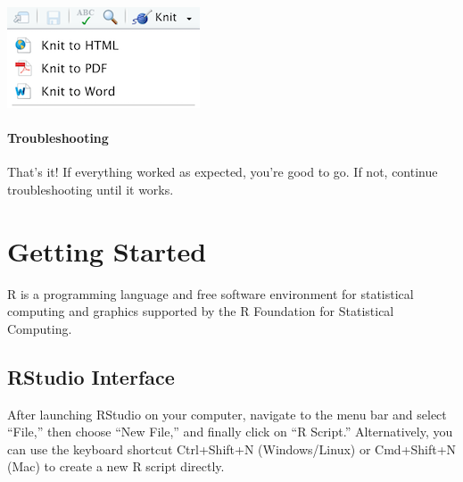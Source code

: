 \documentclass[
]{book}
\begin{document}
\includegraphics[width=\textwidth,height=0.85\textheight]{files/icons-rstudio/knitdownoptions.png}

\hypertarget{troubleshooting}{%
\subsubsection*{Troubleshooting}\label{troubleshooting}}

That's it! If everything worked as expected, you're good to go. If not, continue troubleshooting until it works.

\hypertarget{getting-started}{%
\chapter{Getting Started}\label{getting-started}}

R is a programming language and free software environment for statistical computing and graphics supported by the R Foundation for Statistical Computing.

\hypertarget{rstudio-interface}{%
\section{RStudio Interface}\label{rstudio-interface}}

After launching RStudio on your computer, navigate to the menu bar and select ``File,'' then choose ``New File,'' and finally click on ``R Script.'' Alternatively, you can use the keyboard shortcut Ctrl+Shift+N (Windows/Linux) or Cmd+Shift+N (Mac) to create a new R script directly.
\end{document}
